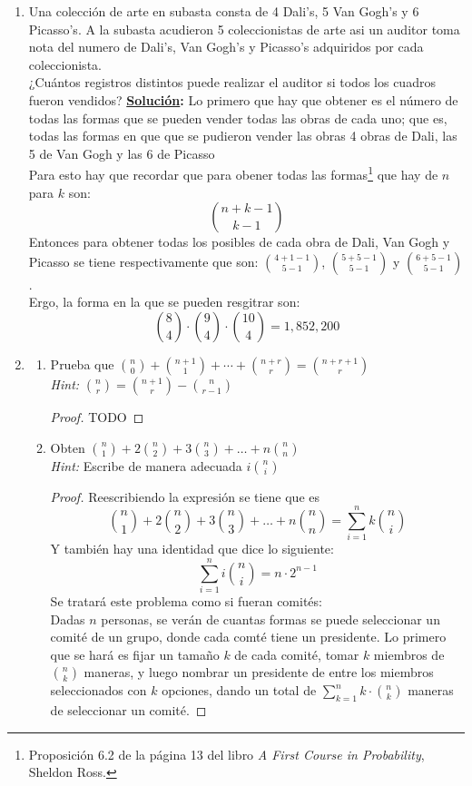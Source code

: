 \documentclass[11pt,letterpaper]{report}
\newcommand{\sol}{\textbf{\underline{Solución}: }} %
\begin{document}
\begin{enumerate}
\item Una colección de arte en subasta consta de 4 Dali's, 5 Van Gogh's y 6 Picasso's. A la subasta
acudieron 5 coleccionistas de arte asi un auditor toma nota del numero de Dali's, Van Gogh's y 
Picasso's adquiridos por cada coleccionista.\\
¿Cuántos registros distintos puede realizar el auditor si todos los cuadros fueron vendidos?
\sol Lo primero que hay que obtener es el número de todas las formas que se pueden vender todas
las obras de cada uno; que es, todas las formas en que que se pudieron vender las obras 4 obras
de Dali, las 5 de Van Gogh y las 6 de Picasso\\
Para esto hay que recordar que para obener todas las formas\footnote{Proposición 6.2 de la página 13
del libro \textit{A First Course in Probability}, Sheldon Ross.} que hay de $n$ para $k$ son:
$$\binom{n+k-1}{k-1}$$
Entonces para obtener todas los posibles de cada obra de Dali, Van Gogh y Picasso se tiene
respectivamente que son: $\binom{4+1-1}{5-1}$, $\binom{5+5-1}{5-1}$ y $\binom{6+5-1}{5-1}$.\\
Ergo, la forma en la que se pueden resgitrar son:
$$\binom{8}{4} \cdot \binom{9}{4} \cdot \binom{10}{4} = 1,852,200$$

\item
\begin{enumerate}[label=\alph*)]
    \item Prueba que $\binom{n}{0} + \binom{n+1}{1} + \cdots + \binom{n+r}{r} = \binom{n+r+1}{r}$\\
    \textit{Hint:} $\binom{n}{r} = \binom{n+1}{r} - \binom{n}{r-1}$
    \begin{proof}
        TODO
    \end{proof}

    \item Obten $\binom{n}{1} + 2\binom{n}{2} + 3\binom{n}{3} + \ldots + n\binom{n}{n}$\\
    \textit{Hint:} Escribe de manera adecuada $i\binom{n}{i}$
    \begin{proof}
        Reescribiendo la expresión se tiene que es
        $$\binom{n}{1} + 2\binom{n}{2} + 3\binom{n}{3} + \ldots + n\binom{n}{n} =
        \sum_{i=1}^n k \binom{n}{i}$$
        Y también hay una identidad que dice lo siguiente:
        $$\sum_{i=1}^n i \binom{n}{i} = n \cdot 2^{n-1}$$
        Se tratará este problema como si fueran comités:\\
        Dadas $n$ personas, se verán de cuantas formas se puede seleccionar un comité
        de un grupo, donde cada comté tiene un presidente. Lo primero que se hará
        es fijar un tamaño $k$ de cada comité, tomar $k$ miembros de $\binom{n}{k}$
        maneras, y luego nombrar un presidente de entre los miembros seleccionados
        con $k$ opciones, dando un total de $\sum_{k=1}^{n} k \cdot \binom{n}{k}$
        maneras de seleccionar un comité.


\end{proof}
\end{enumerate}
\end{enumerate}
\end{document}
